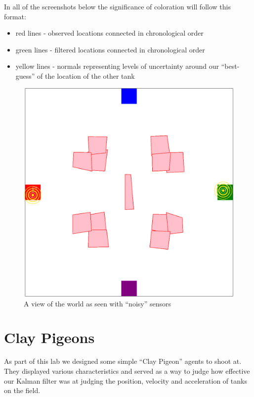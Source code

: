 In all of the screenshots below the significance of coloration will follow this format:
\begin{itemize}
    \item red lines - observed locations connected in chronological order
    \item green lines - filtered locations connected in chronological order
    \item yellow lines - normals representing levels of uncertainty around our ``best-guess'' of the location of the other tank
\end{itemize}
\begin{figure}
   \begin{center}
   	\includegraphics[width=\textwidth]{wackyworld.png}
   \end{center}
   \caption{A view of the world as seen with ``noisy'' sensors}
  \end{figure}
\section{Clay Pigeons}
As part of this lab we designed some simple ``Clay Pigeon'' agents to shoot at.  They displayed various characteristics and served as a way to judge how effective our Kalman filter was at judging the position, velocity and acceleration of tanks on the field.
